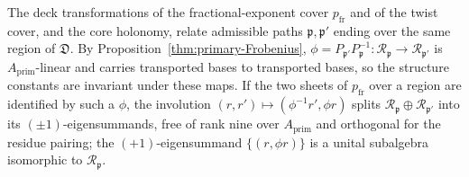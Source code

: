 \begin{remark}
\label{rem:reflection-deck}
The deck transformations of the fractional-exponent cover $p_{\mathrm{fr}}$
and of the twist cover, and the core holonomy, relate admissible paths
$\mathfrak p,\mathfrak p'$ ending over the same region of $\mathfrak D$.  By
Proposition~\ref{thm:primary-Frobenius},
$\phi=P_{\mathfrak p'}P_{\mathfrak p}^{-1}:\mathcal R_{\mathfrak p}\to\mathcal
R_{\mathfrak p'}$ is $A_{\mathrm{prim}}$-linear and carries transported bases
to transported bases, so the structure constants are invariant under these
maps.  If the two sheets of $p_{\mathrm{fr}}$ over a region are identified by
such a $\phi$, the involution $(r,r')\mapsto(\phi^{-1}r',\phi r)$ splits
$\mathcal R_{\mathfrak p}\oplus\mathcal R_{\mathfrak p'}$ into its
$(\pm1)$-eigensummands, free of rank nine over $A_{\mathrm{prim}}$ and
orthogonal for the residue pairing; the $(+1)$-eigensummand
$\{(r,\phi r)\}$ is a unital subalgebra isomorphic to $\mathcal R_{\mathfrak
p}$.
\end{remark}
